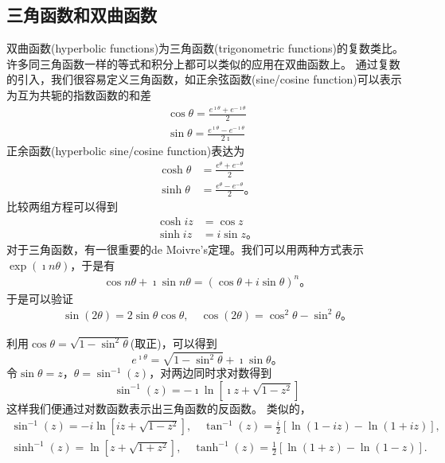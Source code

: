 \subsection{三角函数和双曲函数}
双曲函数(hyperbolic functions)为三角函数(trigonometric functions)的复数类比。
许多同三角函数一样的等式和积分上都可以类似的应用在双曲函数上。
通过复数的引入，我们很容易定义三角函数，如正余弦函数(sine/cosine function)可以表示为互为共轭的指数函数的和差
\begin{align}
    \cos \theta = \frac{e^{\imath \theta} + e^{ -\imath \theta} }{2}
    \\
    \sin \theta = \frac{e^{\imath \theta} - e^{ -\imath \theta} }{2\imath}
\end{align}
正余函数(hyperbolic sine/cosine function)表达为
\begin{align}
    \cosh \theta &= \frac{e^{\theta} + e^{ - \theta} }{2}
    \\
    \sinh \theta &= \frac{e^{\theta} - e^{ - \theta} }{2} \textrm{。}
\end{align}
比较两组方程可以得到
\begin{align}
    \cosh iz &= \cos z
    \\
    \sinh iz &= i \sin z\textrm{。}
\end{align}
对于三角函数，有一很重要的de Moivre's定理。我们可以用两种方式表示$\exp(\imath n \theta)$，于是有
\begin{align}
    \cos n \theta + \imath \sin n\theta = (\cos \theta + i \sin \theta)^n  \textrm{。}
\end{align}
于是可以验证
\begin{align}
    \sin(2\theta) = 2\sin\theta \cos\theta, \quad \cos (2\theta) = \cos^2\theta - \sin^2\theta \textrm{。}
\end{align}

利用$\cos \theta = \sqrt{1 - \sin ^2 \theta }$(取正)，可以得到
\begin{equation}
  e^{\imath \theta} = \sqrt{ 1 - \sin ^2 \theta } + \imath \sin \theta \textrm{。}  
\end{equation} 
令$\sin \theta = z$，$\theta = \sin^{-1} (z)$，对两边同时求对数得到
\begin{equation}
    \sin^{-1} (z) = -\imath \ln \left[ \imath z + \sqrt{1-z^2} \right]
\end{equation}
这样我们便通过对数函数表示出三角函数的反函数。
类似的，
\begin{equation}
    \begin{array}{cc}
    \sin ^{-1}(z)=-i \ln \left[i z+\sqrt{1-z^2}\right], \quad \tan ^{-1}(z)=\frac{i}{2}[\ln (1-i z)-\ln (1+i z)], \\
    \sinh ^{-1}(z)=\ln \left[z+\sqrt{1+z^2}\right], \quad \tanh ^{-1}(z)=\frac{1}{2}[\ln (1+z)-\ln (1-z)] .
    \end{array}
\end{equation}

